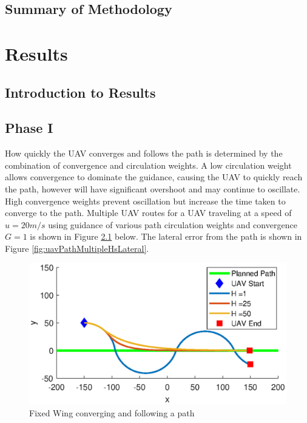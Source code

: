 \documentclass[numbered,pdftex]{ohio-etd}
\begin{document}
\section{Summary of Methodology}


\chapter{Results}
\section{Introduction to Results}
\section{Phase I}
How quickly the UAV converges and follows the path is determined by the combination of convergence and circulation weights. A low circulation weight allows convergence to dominate the guidance, causing the UAV to quickly reach the path, however will have significant overshoot and may continue to oscillate. High convergence weights prevent oscillation but increase the time taken to converge to the path. Multiple UAV routes for a UAV traveling at a speed of $u=20m/s$ using guidance of various path circulation weights and convergence $G=1$ is shown in Figure \ref{fig:uavPathMultipleHs} below. The lateral error from the path is shown in Figure \ref{fig:uavPathMultipleHsLateral}. 


\begin{figure}[H]
	\centering
	\includegraphics[trim=0 30 0 65,clip,width=14cm]{PaperFigures/Methods/pathMultipleHs}
	\caption{Fixed Wing converging and following a path}
	\label{fig:uavPathMultipleHs}
\end{figure}
\end{document}
